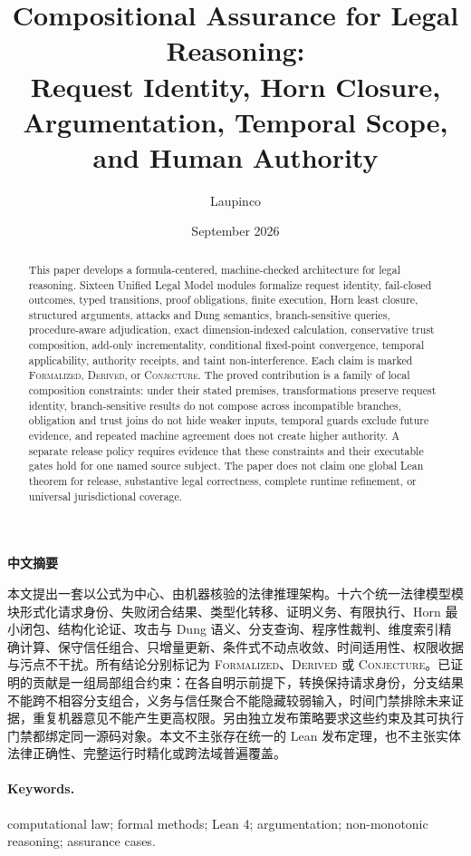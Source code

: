 \documentclass[11pt,a4paper]{article}
\title{Compositional Assurance for Legal Reasoning:\\
Request Identity, Horn Closure, Argumentation, Temporal Scope, and Human Authority}
\author{Laupinco}
\date{September 2026}
\newcommand{\formalized}{\textsc{Formalized}}
\newcommand{\derived}{\textsc{Derived}}
\newcommand{\conjectured}{\textsc{Conjecture}}
\begin{document}
\maketitle

\begin{abstract}
This paper develops a formula-centered, machine-checked architecture for legal reasoning. Sixteen Unified Legal Model modules formalize request identity, fail-closed outcomes, typed transitions, proof obligations, finite execution, Horn least closure, structured arguments, attacks and Dung semantics, branch-sensitive queries, procedure-aware adjudication, exact dimension-indexed calculation, conservative trust composition, add-only incrementality, conditional fixed-point convergence, temporal applicability, authority receipts, and taint non-interference. Each claim is marked \formalized{}, \derived{}, or \conjectured{}. The proved contribution is a family of local composition constraints: under their stated premises, transformations preserve request identity, branch-sensitive results do not compose across incompatible branches, obligation and trust joins do not hide weaker inputs, temporal guards exclude future evidence, and repeated machine agreement does not create higher authority. A separate release policy requires evidence that these constraints and their executable gates hold for one named source subject. The paper does not claim one global Lean theorem for release, substantive legal correctness, complete runtime refinement, or universal jurisdictional coverage.
\end{abstract}

\begin{center}\textbf{中文摘要}\end{center}

本文提出一套以公式为中心、由机器核验的法律推理架构。十六个统一法律模型模块形式化请求身份、失败闭合结果、类型化转移、证明义务、有限执行、Horn 最小闭包、结构化论证、攻击与 Dung 语义、分支查询、程序性裁判、维度索引精确计算、保守信任组合、只增量更新、条件式不动点收敛、时间适用性、权限收据与污点不干扰。所有结论分别标记为 \formalized{}、\derived{} 或 \conjectured{}。已证明的贡献是一组局部组合约束：在各自明示前提下，转换保持请求身份，分支结果不能跨不相容分支组合，义务与信任聚合不能隐藏较弱输入，时间门禁排除未来证据，重复机器意见不能产生更高权限。另由独立发布策略要求这些约束及其可执行门禁都绑定同一源码对象。本文不主张存在统一的 Lean 发布定理，也不主张实体法律正确性、完整运行时精化或跨法域普遍覆盖。

\paragraph{Keywords.} computational law; formal methods; Lean 4; argumentation; non-monotonic reasoning; assurance cases.
\end{document}
